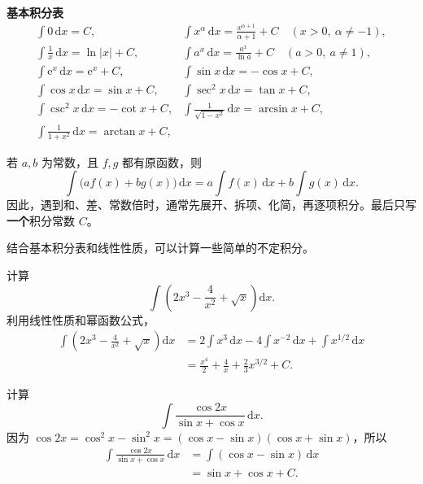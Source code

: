 \documentclass[fontset=fandol]{ctexart}
\newenvironment{custom}[1]{\par\noindent\textbf{#1}\quad}{\par\vspace{0.8em}}
\newcommand{\dd}{\mathrm{d}}
\newcommand{\ee}{\mathrm{e}}
\begin{document}
\begin{custom}{基本积分表}
\[
\begin{array}{ll}
\displaystyle \int 0\,\dd x=C,
&
\displaystyle \int x^\alpha\,\dd x=\frac{x^{\alpha+1}}{\alpha+1}+C\quad(x>0,\ \alpha\neq-1),
\\[1.2em]
\displaystyle \int \frac{1}{x}\,\dd x=\ln|x|+C,
&
\displaystyle \int a^x\,\dd x=\frac{a^x}{\ln a}+C\quad(a>0,\ a\neq1),
\\[1.2em]
\displaystyle \int \ee^x\,\dd x=\ee^x+C,
&
\displaystyle \int \sin x\,\dd x=-\cos x+C,
\\[1.2em]
\displaystyle \int \cos x\,\dd x=\sin x+C,
&
\displaystyle \int \sec^2 x\,\dd x=\tan x+C,
\\[1.2em]
\displaystyle \int \csc^2 x\,\dd x=-\cot x+C,
&
\displaystyle \int \frac{1}{\sqrt{1-x^2}}\,\dd x=\arcsin x+C,
\\[1.2em]
\displaystyle \int \frac{1}{1+x^2}\,\dd x=\arctan x+C,
&
\end{array}
\]
\end{custom}

\begin{proposition}[线性性质]
若 $a,b$ 为常数，且 $f,g$ 都有原函数，则
\[
\int \bigl(af(x)+bg(x)\bigr)\,\dd x
=a\int f(x)\,\dd x+b\int g(x)\,\dd x.
\]
因此，遇到和、差、常数倍时，通常先展开、拆项、化简，再逐项积分。最后只写\textbf{一个}积分常数 $C$。
\end{proposition}

结合基本积分表和线性性质，可以计算一些简单的不定积分。

\begin{example}[直接积分]
计算
\[
\int \left(2x^3-\frac{4}{x^2}+\sqrt{x}\right)\dd x.
\]
利用线性性质和幂函数公式，
\[
\begin{aligned}
\int \left(2x^3-\frac{4}{x^2}+\sqrt{x}\right)\dd x
&=2\int x^3\,\dd x-4\int x^{-2}\,\dd x+\int x^{1/2}\,\dd x\\
&=\frac{x^4}{2}+\frac{4}{x}+\frac{2}{3}x^{3/2}+C.
\end{aligned}
\]
\end{example}

\begin{example}[先化简再积分]
计算
\[
\int \frac{\cos 2x}{\sin x+\cos x}\,\dd x.
\]
因为 $\cos2x=\cos^2x-\sin^2x=(\cos x-\sin x)(\cos x+\sin x)$，所以
\[
\begin{aligned}
\int \frac{\cos 2x}{\sin x+\cos x}\,\dd x
&=\int(\cos x-\sin x)\,\dd x\\
&=\sin x+\cos x+C.
\end{aligned}
\]
\end{example}
\end{document}
